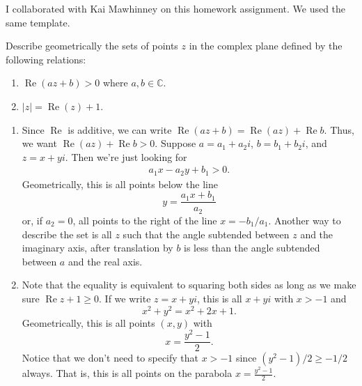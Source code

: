 \documentclass[12 pt, letterpaper]{hmcpset}
\begin{document}
I collaborated with Kai Mawhinney on this homework assignment. We used the same template.

\begin{problem}[1]
	Describe geometrically the sets of points $z$ in the complex plane defined by the following relations:
	\begin{enumerate}
		\item $\operatorname{Re}(az + b) > 0$ where $a, b \in \mathbb{C}$.
		\item $\lvert z \rvert = \operatorname{Re}(z) + 1$.
	\end{enumerate}
\end{problem}

\begin{solution}
	\begin{enumerate}
		\item Since $\operatorname{Re}$ is additive, we can write $\operatorname{Re}(az + b) = \operatorname{Re}(az) + \operatorname{Re} b$. Thus, we want $\operatorname{Re}(az) + \operatorname{Re} b > 0$. Suppose $a = a_{1} + a_{2} i$, $b = b_{1} + b_{2} i$, and $z = x + y i$. Then we're just looking for
			\[
				\begin{split}
					a_{1} x - a_{2} y + b_{1} > 0.
				\end{split}
			\]
			Geometrically, this is all points below the line
			 \[
				 y = \frac{a_{1} x  + b_{1}}{a_2}
			\]
			or, if $a_{2} = 0$, all points to the right of the line $x = -b_{1} / a_{1}$.
			Another way to describe the set is all $z$ such that the angle subtended between $z$ and the imaginary axis, after translation by $b$ is less than the angle subtended between $a$ and the real axis.
		\item Note that the equality is equivalent to squaring both sides as long as we make sure $\operatorname{Re} z + 1 \ge 0$. If we write $z = x + y i$, this is all $x + y i$ with $x > - 1$ and
			\[
				x^{2} + y^{2} = x^{2} + 2x + 1.
			\]
			Geometrically, this is all points $(x, y)$ with
			\[
				x = \frac{y^{2} - 1}{2}.
			\]
			Notice that we don't need to specify that $x > - 1$ since ${(y^{2} - 1)}/{2} \ge -1/2$ always. That is, this is all points on the parabola $x = \frac{y^{2} - 1}{2}$.
	\end{enumerate}
\end{solution}

\pagebreak
\end{document}
